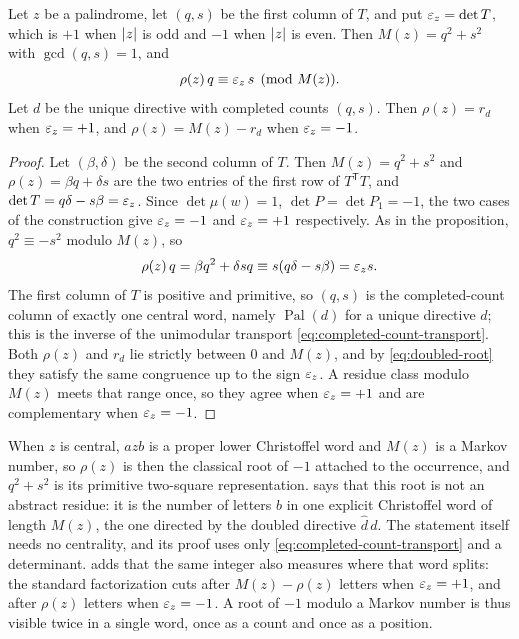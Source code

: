 \begin{corollary}
\label{cor:gram-root-letter-count}
Let $z$ be a palindrome, let $(q,s)$ be the first column of $T$, and put
$\varepsilon_z=\det T$, which is $+1$ when $\lvert z\rvert$ is odd and $-1$ when
$\lvert z\rvert$ is even. Then $M(z)=q^2+s^2$ with $\gcd(q,s)=1$, and
$$
 \rho(z)\,q\equiv\varepsilon_z\,s \pmod{M(z)} .
$$
Let $d$ be the unique directive with completed counts $(q,s)$. Then
$\rho(z)=r_d$ when $\varepsilon_z=+1$, and $\rho(z)=M(z)-r_d$ when
$\varepsilon_z=-1$.
\end{corollary}

\begin{proof}
Let $(\beta,\delta)$ be the second column of $T$. Then $M(z)=q^2+s^2$
and $\rho(z)=\beta q+\delta s$ are the two entries of the first row of
$T^{\mathsf T}T$, and $\det T=q\delta-s\beta=\varepsilon_z$. Since
$\det\mu(w)=1$, $\det P=\det P_1=-1$, the two cases of the construction
give $\varepsilon_z=-1$ and $\varepsilon_z=+1$ respectively. As in the proposition,
$q^2\equiv-s^2$ modulo $M(z)$, so
$$
 \rho(z)\,q=\beta q^2+\delta sq\equiv s(q\delta-s\beta)=\varepsilon_z s .
$$
The first column of $T$ is positive and primitive, so $(q,s)$ is the
completed-count column of exactly one central word, namely
$\operatorname{Pal}(d)$ for a unique directive $d$; this is the
inverse of the unimodular transport
\eqref{eq:completed-count-transport}. Both $\rho(z)$ and $r_d$ lie
strictly between $0$ and $M(z)$, and by
\eqref{eq:doubled-root} they satisfy the same congruence up to the sign
$\varepsilon_z$. A residue class modulo $M(z)$ meets that range once, so they
agree when $\varepsilon_z=+1$ and are complementary when $\varepsilon_z=-1$.
\end{proof}

When $z$ is central, $azb$ is a proper lower Christoffel word and $M(z)$
is a Markov number, so $\rho(z)$ is then the classical root of $-1$
attached to the occurrence, and $q^2+s^2$ is its primitive two-square
representation.  says that this root
is not an abstract residue: it is the number of letters $b$ in one
explicit Christoffel word of length $M(z)$, the one directed by the
doubled directive $\widehat d\,d$. The statement itself needs no
centrality, and its proof uses only \eqref{eq:completed-count-transport}
and a determinant.  adds that the same integer
also measures where that word splits: the standard factorization cuts after
$M(z)-\rho(z)$ letters when $\varepsilon_z=+1$, and after $\rho(z)$ letters when
$\varepsilon_z=-1$. A root of $-1$ modulo a Markov number is thus visible twice in a
single word, once as a count and once as a position.

